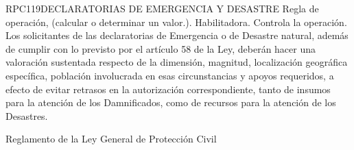 \begin{BusinessRule}{RPC119}{DECLARATORIAS DE EMERGENCIA Y DESASTRE}{
		Regla de operación, (calcular o determinar un valor.).
	}{
		Habilitadora. 
	}{
		Controla la operación. %
	}
	\BRItem[Descripción:]Los solicitantes de las declaratorias de Emergencia o de Desastre natural, además de cumplir con lo previsto por el artículo 58 de la Ley, deberán hacer una valoración sustentada respecto de la dimensión, magnitud, localización geográfica específica, población involucrada en esas circunstancias y apoyos requeridos, a efecto de evitar retrasos en la autorización correspondiente, tanto de insumos para la atención de los Damnificados, como de recursos para la atención de los Desastres. 
	
	
	 Reglamento de la Ley General de Protección Civil
\end{BusinessRule}